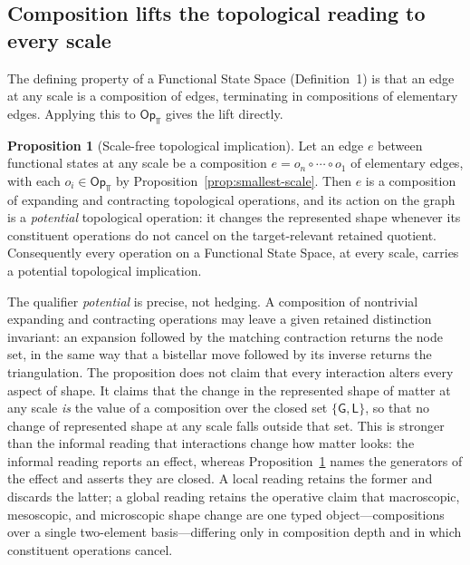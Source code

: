 \documentclass[10pt,twoside,a5paper]{article}
\theoremstyle{definition}
\newtheorem{claimprop}{Proposition}
\begin{document}
\subsection{Composition lifts the topological reading to every scale}
\label{subsec:composition-lifts}

The defining property of a Functional State Space (Definition~1) is that an edge at
any scale is a composition of edges, terminating in compositions of elementary edges.
Applying this to $\mathsf{Op}_{\Top}$ gives the lift directly.

\begin{claimprop}[Scale-free topological implication]
\label{prop:scale-free}
Let an edge $e$ between functional states at any scale be a composition
$e=o_{n}\circ\cdots\circ o_{1}$ of elementary edges, with each
$o_{i}\in\mathsf{Op}_{\Top}$ by Proposition~\ref{prop:smallest-scale}. Then $e$ is a
composition of expanding and contracting topological operations, and its action on the
graph is a \emph{potential} topological operation: it changes the represented shape
whenever its constituent operations do not cancel on the target-relevant retained
quotient. Consequently every operation on a Functional State Space, at every scale,
carries a potential topological implication.
\end{claimprop}

The qualifier \emph{potential} is precise, not hedging. A composition of nontrivial
expanding and contracting operations may leave a given retained distinction invariant:
an expansion followed by the matching contraction returns the node set, in the same
way that a bistellar move followed by its inverse returns the triangulation. The
proposition does not claim that every interaction alters every aspect of shape. It
claims that the change in the represented shape of matter at any scale \emph{is} the
value of a composition over the closed set $\{\mathsf{G},\mathsf{L}\}$, so that no
change of represented shape at any scale falls outside that set. This is stronger than
the informal reading that interactions change how matter looks: the informal reading
reports an effect, whereas Proposition~\ref{prop:scale-free} names the generators of
the effect and asserts they are closed. A local reading retains the former and
discards the latter; a global reading retains the operative claim that macroscopic,
mesoscopic, and microscopic shape change are one typed object---compositions over a
single two-element basis---differing only in composition depth and in which
constituent operations cancel.
\end{document}
